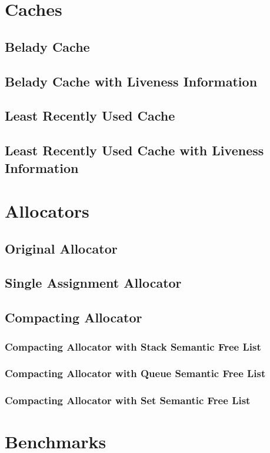 \documentclass[onecolumn, openany, master, english, seal, signatures]{dbrgrptt}
\begin{document}
\section{Caches}\label{sec:caches}
\subsection{Belady Cache}
\subsection{Belady Cache with Liveness Information}
\subsection{Least Recently Used Cache}
\subsection{Least Recently Used Cache with Liveness Information}

\section{Allocators}
\subsection{Original Allocator}
\subsection{Single Assignment Allocator}
\subsection{Compacting Allocator}
\subsubsection{Compacting Allocator with Stack Semantic Free List}
\subsubsection{Compacting Allocator with Queue Semantic Free List}
\subsubsection{Compacting Allocator with Set Semantic Free List}

\section{Benchmarks}
\end{document}
